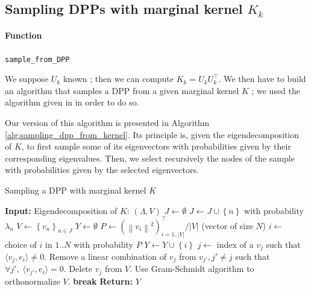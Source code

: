 \documentclass{article}
\newcommand{\abs} [1] {\left| #1 \right|}
\newcommand{\norm}[1]{\left\|#1\right\|}
\newcommand{\scal}[2]{\langle #1,#2 \rangle}
\begin{document}
\subsection[Sampling DPPs with marginal kernel Kk]{Sampling DPPs with marginal kernel $K_k$}


\paragraph{Function} \verb#sample_from_DPP#


We suppose $U_k$ known ; then we can compute $K_k = U_k U_k^\top$. We then have to build an algorithm that samples a DPP from a given marginal kernel $K$ ; we used the algorithm given in \cite{tremblay2017, kuelsza2012} in order to do so. 


Our version of this algorithm is presented in Algorithm \ref{alg:sampling_dpp_from_kernel}. Its principle is, given the eigendecomposition of $K$, to first sample some of its eigenvectors with probabilities given by their corresponding eigenvalues. Then, we select recursively the nodes of the sample with probabilities given by the selected eigenvectors.


\begin{algorithm}[ht]
\caption{Sampling a DPP with marginal kernel $K$}
\label{alg:sampling_dpp_from_kernel}
\begin{algorithmic} %
    \STATE \textbf{Input:} Eigendecomposition of $K$: $(\Lambda, V)$
    \STATE $J \leftarrow \emptyset$
			\STATE $J \leftarrow J \cup \left\{ n \right\}$ with probability $\lambda_n$
		\ENDFOR
		\STATE $V \leftarrow \left\{ v_n \right\}_{n \in J}$
		\STATE $Y \leftarrow \emptyset$
    \WHILE{$\abs{V} > 0$}
        \STATE $P \leftarrow (\norm{v_i}^2)_{i=1..\abs{V}}^\top / \abs{V}$ (vector of size $N$)
				\STATE $i \leftarrow$ choice of $i$ in $1..N$ with probability $P$
				\STATE $Y \leftarrow Y \cup \left\{i\right\}$
				\IF{$\abs{V} > 1$}
					\STATE $j \leftarrow$ index of a $v_j$ such that $\scal{v_j}{e_i} \neq 0$.
					\STATE Remove a linear combination of $v_j$ from $v_{j'}, j'\neq j$ such that $\forall j', \; \scal{v_{j'}}{e_i} = 0$.
					\STATE Delete $v_j$ from $V$.
					\STATE Use Gram-Schmidt algorithm to orthonormalize $V$.
				\ELSE
					\STATE \textbf{break}
				\ENDIF
    \ENDWHILE
		\STATE \textbf{Return:} $Y$
\end{algorithmic}
\end{algorithm}
\end{document}
